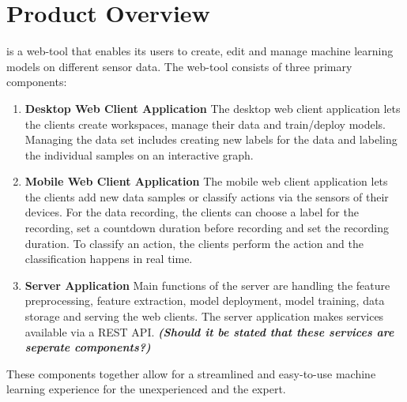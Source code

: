 \section{Product Overview}

 {\pseProjectName} is a web-tool that enables its users to create, edit and manage machine learning models on different sensor data. The web-tool consists of three primary components:

\begin{enumerate}
    \item \textbf{Desktop Web Client Application}
    The desktop web client application lets the clients create workspaces, manage their data and train/deploy models. Managing the data set includes creating new labels for the data and labeling the individual samples on an interactive graph.

    \item \textbf{Mobile Web Client Application}
    The mobile web client application lets the clients add new data samples or classify actions via the sensors of their devices. For the data recording, the clients can choose a label for the recording, set a countdown duration before recording and set the recording duration. To \gls{classify} an action, the clients perform the action and the classification happens in real time.

    \item \textbf{Server Application}
     Main functions of the server are handling the feature preprocessing, feature extraction, model deployment, model training, data storage and serving the web clients. The server application makes services available via a REST API. \textbf{\emph{(Should it be stated that these services are seperate components?)}}
\end{enumerate}

These components together allow for a streamlined and easy-to-use machine learning experience for the unexperienced and the expert.